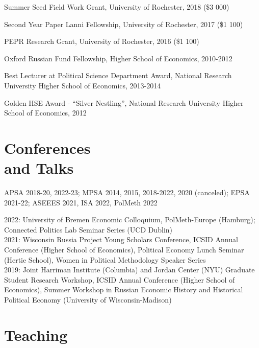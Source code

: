 \documentclass[margin,line,10.95pt]{res}
\begin{document}
\begin{resume}
Summer Seed Field Work Grant, University of Rochester, 2018 (\$3 000)
\vspace*{-4.5mm}

Second Year Paper Lanni Fellowship, University of Rochester, 2017 (\$1 100)
\vspace*{-4.5mm}

PEPR Research Grant, University of Rochester, 2016 (\$1 100)
\vspace*{-4.5mm}


Oxford Russian Fund Fellowship, Higher School of Economics, 2010-2012 
\vspace*{-2.5mm}

Best Lecturer at Political Science Department Award, National Research University Higher School of Economics, 2013-2014 
\vspace*{-4.5mm}

Golden HSE Award - ``Silver Nestling'', National Research University Higher School of Economics, 2012
\vspace*{-2.5mm}


\section{\sc Conferences \\ and Talks}

APSA 2018-20, 2022-23; MPSA 2014, 2015, 2018-2022, 2020 (canceled); EPSA 2021-22; ASEEES 2021, ISA 2022, PolMeth 2022
  \vspace*{-4.5mm} 

2022: University of Bremen Economic Colloquium, PolMeth-Europe (Hamburg); Connected Politics Lab Seminar Series (UCD Dublin)
\\
2021: Wisconsin Russia Project Young Scholars Conference, ICSID Annual Conference (Higher School of Economics), Political Economy Lunch Seminar (Hertie School), Women in Political Methodology Speaker Series
\\
2019: Joint Harriman Institute (Columbia) and Jordan Center (NYU) Graduate Student Research Workshop,  ICSID Annual Conference (Higher School of Economics), Summer Workshop in Russian Economic History and Historical Political Economy (University of Wisconsin-Madison) 


\section{\sc Teaching }


\end{resume}
\end{document}

